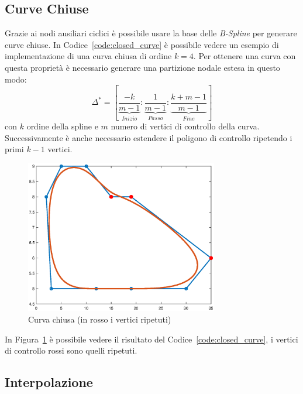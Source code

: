 \documentclass[a4paper, 12pt]{article}
\begin{document}
\subsection{Curve Chiuse}
Grazie ai nodi ausiliari ciclici è possibile usare la base delle \textit{B-Spline} per generare
curve chiuse. In Codice~\ref{code:closed_curve} è possibile vedere un esempio di implementazione di una curva chiusa di 
ordine $k = 4$.
Per ottenere una curva con questa proprietà è necessario generare una partizione nodale estesa in questo modo:
$$\Delta^* = \left[ \underbrace{\frac{-k}{m-1}}_{Inizio} : \underbrace{\frac{1}{m-1}}_{Passo} : \underbrace{\frac{k+m-1}{m-1}}_{Fine} \right]$$
con $k$ ordine della spline e $m$ numero di vertici di controllo della curva.
Successivamente è anche necessario estendere il poligono di controllo ripetendo i primi $k-1$ vertici.

\begin{figure}[]
  \centering
  \includegraphics[width=0.75\textwidth]{figure/closed_curve.eps}
  \caption{Curva chiusa (in rosso i vertici ripetuti)}
  \label{fig:closed_curve}
\end{figure} 
In Figura~\ref{fig:closed_curve} è possibile vedere il risultato del Codice~\ref{code:closed_curve}, i vertici di controllo rossi sono 
quelli ripetuti.

\subsection{Interpolazione}
\end{document}
